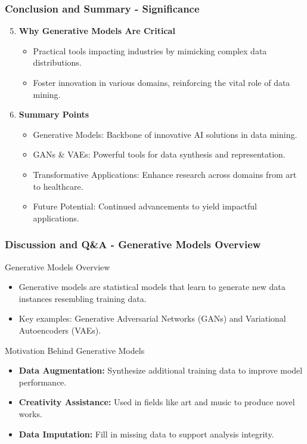 \documentclass[aspectratio=169]{beamer}
\begin{document}
\begin{frame}[fragile]
    \frametitle{Conclusion and Summary - Significance}
    \begin{enumerate}
        \setcounter{enumi}{4}  %
        \item \textbf{Why Generative Models Are Critical}
            \begin{itemize}
                \item Practical tools impacting industries by mimicking complex data distributions.
                \item Foster innovation in various domains, reinforcing the vital role of data mining.
            \end{itemize}
        
        \item \textbf{Summary Points}
            \begin{itemize}
                \item Generative Models: Backbone of innovative AI solutions in data mining.
                \item GANs \& VAEs: Powerful tools for data synthesis and representation.
                \item Transformative Applications: Enhance research across domains from art to healthcare.
                \item Future Potential: Continued advancements to yield impactful applications.
            \end{itemize}
    \end{enumerate}
\end{frame}

\begin{frame}[fragile]
    \frametitle{Discussion and Q\&A - Generative Models Overview}
    \begin{block}{Generative Models Overview}
        \begin{itemize}
            \item Generative models are statistical models that learn to generate new data instances resembling training data.
            \item Key examples: Generative Adversarial Networks (GANs) and Variational Autoencoders (VAEs).
        \end{itemize}
    \end{block}
    \begin{block}{Motivation Behind Generative Models}
        \begin{itemize}
            \item \textbf{Data Augmentation:} Synthesize additional training data to improve model performance.
            \item \textbf{Creativity Assistance:} Used in fields like art and music to produce novel works.
            \item \textbf{Data Imputation:} Fill in missing data to support analysis integrity.
        \end{itemize}
    \end{block}
\end{frame}
\end{document}
